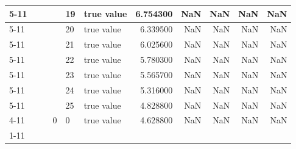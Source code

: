 \begin{tabular}{llllllrrrrr}
\cline{5-11}
 &  &  &  & 19 & true value & 6.754300 & NaN & NaN & NaN & NaN \\
\cline{5-11}
 &  &  &  & 20 & true value & 6.339500 & NaN & NaN & NaN & NaN \\
\cline{5-11}
 &  &  &  & 21 & true value & 6.025600 & NaN & NaN & NaN & NaN \\
\cline{5-11}
 &  &  &  & 22 & true value & 5.780300 & NaN & NaN & NaN & NaN \\
\cline{5-11}
 &  &  &  & 23 & true value & 5.565700 & NaN & NaN & NaN & NaN \\
\cline{5-11}
 &  &  &  & 24 & true value & 5.316000 & NaN & NaN & NaN & NaN \\
\cline{5-11}
 &  &  &  & 25 & true value & 4.828800 & NaN & NaN & NaN & NaN \\
\cline{4-11} \cline{5-11}
 &  &  & 0 & 0 & true value & 4.628800 & NaN & NaN & NaN & NaN \\
\cline{1-11} \cline{2-11} \cline{3-11} \cline{4-11} \cline{5-11}
\bottomrule
\end{tabular}
